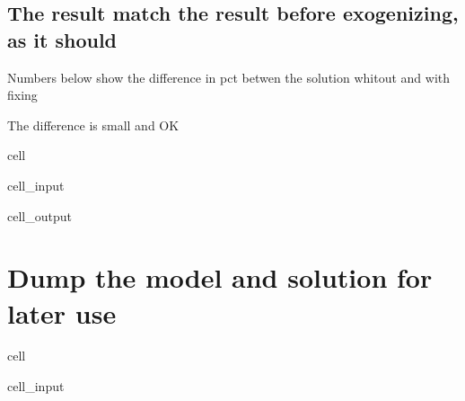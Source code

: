 \documentclass[letterpaper,10pt,english]{jupyterBook}
\begin{document}
\subsection{The result match the result before exogenizing, as it should}
\label{\detokenize{content/howto/fixing/Fixing variables:the-result-match-the-result-before-exogenizing-as-it-should}}
\sphinxAtStartPar
Numbers below show the difference in pct betwen the solution whitout and with fixing

\sphinxAtStartPar
The difference is small and OK

\begin{sphinxuseclass}{cell}\begin{sphinxVerbatimInput}

\begin{sphinxuseclass}{cell_input}
\begin{sphinxVerbatim}[commandchars=\\\{\}]
 
\end{sphinxVerbatim}

\end{sphinxuseclass}\end{sphinxVerbatimInput}
\begin{sphinxVerbatimOutput}

\begin{sphinxuseclass}{cell_output}
\noindent{}

\end{sphinxuseclass}\end{sphinxVerbatimOutput}

\end{sphinxuseclass}

\section{Dump the model and solution for later use}
\label{\detokenize{content/howto/fixing/Fixing variables:dump-the-model-and-solution-for-later-use}}
\begin{sphinxuseclass}{cell}\begin{sphinxVerbatimInput}

\begin{sphinxuseclass}{cell_input}
\begin{sphinxVerbatim}[commandchars=\\\{\}]
\end{sphinxVerbatim}

\end{sphinxuseclass}\end{sphinxVerbatimInput}

\end{sphinxuseclass}
\end{document}

